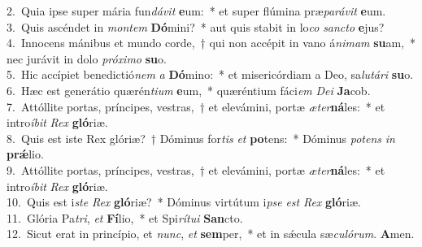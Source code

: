 {2.~}Quia ipse super mária fun\textit{dá}\textit{vit} \textbf{e}um:~* et super flúmina præ\textit{pa}\textit{rá}\textit{vit} \textbf{e}um.\\
{3.~}Quis ascéndet in \textit{mon}\textit{tem} \textbf{Dó}mini?~* aut quis stabit in lo\textit{co} \textit{san}\textit{cto} \textbf{e}jus?\\
{4.~}Innocens mánibus et mundo corde,~† qui non accépit in vano á\textit{ni}\textit{mam} \textbf{su}am,~* nec jurávit in dolo \textit{pró}\textit{xi}\textit{mo} \textbf{su}o.\\
{5.~}Hic accípiet benedictió\textit{nem} \textit{a} \textbf{Dó}mino:~* et misericórdiam a Deo, sa\textit{lu}\textit{tá}\textit{ri} \textbf{su}o.\\
{6.~}Hæc est generátio quærén\textit{ti}\textit{um} \textbf{e}um,~* quæréntium fáci\textit{em} \textit{De}\textit{i} \textbf{Ja}cob.\\
{7.~}Attóllite portas, príncipes, vestras,~† et elevámini, portæ \textit{æ}\textit{ter}\textbf{ná}les:~* et intro\textit{í}\textit{bit} \textit{Rex} \textbf{gló}riæ.\\
{8.~}Quis est iste Rex glóriæ?~† Dóminus for\textit{tis} \textit{et} \textbf{po}tens:~* Dóminus \textit{po}\textit{tens} \textit{in} \textbf{prǽ}lio.\\
{9.~}Attóllite portas, príncipes, vestras,~† et elevámini, portæ \textit{æ}\textit{ter}\textbf{ná}les:~* et intro\textit{í}\textit{bit} \textit{Rex} \textbf{gló}riæ.\\
{10.~}Quis est i\textit{ste} \textit{Rex} \textbf{gló}riæ?~* Dóminus virtútum i\textit{pse} \textit{est} \textit{Rex} \textbf{gló}riæ.\\
{11.~}Glória Pa\textit{tri}, \textit{et} \textbf{Fí}lio,~* et Spi\textit{rí}\textit{tu}\textit{i} \textbf{San}cto.\\
{12.~}Sicut erat in princípio, et \textit{nunc}, \textit{et} \textbf{sem}per,~* et in sǽcula sæ\textit{cu}\textit{ló}\textit{rum}. \textbf{A}men.\\
